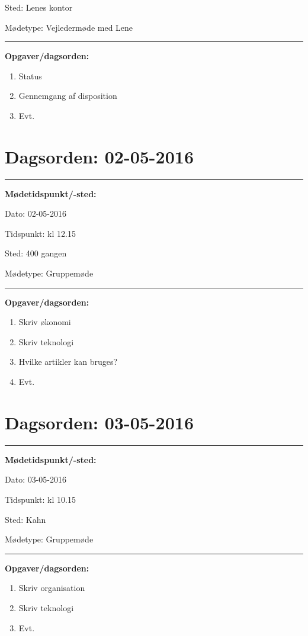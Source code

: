 Sted: \tabto{7em} Lenes kontor

Mødetype: \tabto{7em} Vejledermøde med Lene \newline


\hrule
\textbf{Opgaver/dagsorden:} \newline
\begin{enumerate}
	\item Status
	\item Gennemgang af disposition
	\item Evt. 
\end{enumerate} 


\newpage
\section{Dagsorden: 02-05-2016 }
\hrule
\textbf{Mødetidspunkt/-sted:} 

Dato: \tabto{7em} 02-05-2016

Tidspunkt: \tabto{7em} kl 12.15

Sted: \tabto{7em} 400 gangen 

Mødetype: \tabto{7em} Gruppemøde \newline


\hrule
\textbf{Opgaver/dagsorden:} \newline
\begin{enumerate}
	\item Skriv økonomi 
	\item Skriv teknologi
	\item Hvilke artikler kan bruges?  
	\item Evt. 
\end{enumerate} 


\section{Dagsorden: 03-05-2016 }
\hrule
\textbf{Mødetidspunkt/-sted:} 

Dato: \tabto{7em} 03-05-2016

Tidspunkt: \tabto{7em} kl 10.15

Sted: \tabto{7em} Kahn 

Mødetype: \tabto{7em} Gruppemøde \newline


\hrule
\textbf{Opgaver/dagsorden:} \newline
\begin{enumerate}
	\item Skriv organisation 
	\item Skriv teknologi   
	\item Evt. 
\end{enumerate}

